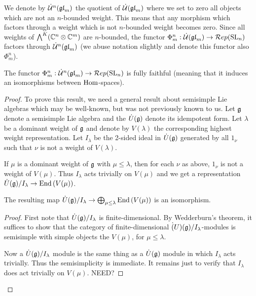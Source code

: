 \documentclass[10pt,leqno]{article}
\begin{document}
We denote by $\dot{{\mathcal{U}}}^n({\mathfrak{gl}}_m)$ the quotient of $\dot{{\mathcal{U}}}({\mathfrak{gl}}_m)$ where we set to zero all objects which are not an $n$-bounded weight. This means that any morphism which factors through a weight which is not $n$-bounded weight becomes zero. Since all weights of $\bigwedge^K(\mathbb{C}^n \otimes \mathbb{C}^m)$ are $ n$-bounded, the functor $\Phi_m^n: \dot{{\mathcal{U}}}({\mathfrak{gl}}_m)\rightarrow \mathcal{R}ep({\rm{SL}}_n)$ factors through $\dot{{\mathcal{U}}}^n({\mathfrak{gl}}_m)$ (we abuse notation slightly and denote this functor also $\Phi_m^n$).

\begin{thm}\label{th:functorfullyfaithful}
The functor $\Phi_m^n: \dot{{\mathcal{U}}}^n({\mathfrak{gl}}_m) \rightarrow \mathcal{R}ep({\rm{SL}}_n)$ is fully faithful (meaning that it induces an isomorphisms between $\operatorname{Hom}$-spaces).
\end{thm}
\begin{proof}
To prove this result, we need a general result about semisimple Lie algebras which may be well-known, but was not previously known to us. Let $ {\mathfrak{g}} $ denote a semisimple Lie algebra and the $\dot{U}({\mathfrak{g}})$ denote its idempotent form.  Let $ \lambda $ be a dominant weight of ${\mathfrak{g}}$ and denote by $V(\lambda)$ the corresponding highest weight representation. Let $ I_\lambda $ be the 2-sided ideal in $\dot{U}({\mathfrak{g}})$ generated by all $ 1_\nu $ such that $ \nu $ is not a weight of $V(\lambda)$.

If $ \mu $ is a dominant weight of $ {\mathfrak{g}} $ with $ \mu \le \lambda $, then for each $ \nu $ as above, $ 1_\nu $ is not a weight of $V(\mu)$.  Thus $ I_\lambda $ acts trivially on $ V(\mu) $ and we get a representation $ \dot{U}({\mathfrak{g}}) / I_\lambda \rightarrow \operatorname{End}\left(V(\mu)\right) $.

\begin{lem}
The resulting map $ \dot{U}({\mathfrak{g}}) / I_\lambda \rightarrow \bigoplus_{\mu \le \lambda} \operatorname{End}\left(V(\mu)\right)$ is an isomorphism.
\end{lem}
\begin{proof}
First note that $\dot{U}({\mathfrak{g}})/ I_\lambda $ is finite-dimensional.  By Wedderburn's theorem, it suffices to show that the category of finite-dimensional $\dot(U)({\mathfrak{g}})/I_\lambda$-modules is semisimple with simple objects the $V(\mu)$, for $\mu \le \lambda$.

Now a $\dot{U}({\mathfrak{g}})/I_\lambda$ module is the same thing as a $\dot{U}({\mathfrak{g}}) $ module in which $ I_\lambda $ acts trivially.  Thus the semisimplicity is immediate.  It remains just to verify that $ I_\lambda $ does act trivially on $V(\mu)$.
NEED?
\end{proof}


\end{proof}
\end{document}
